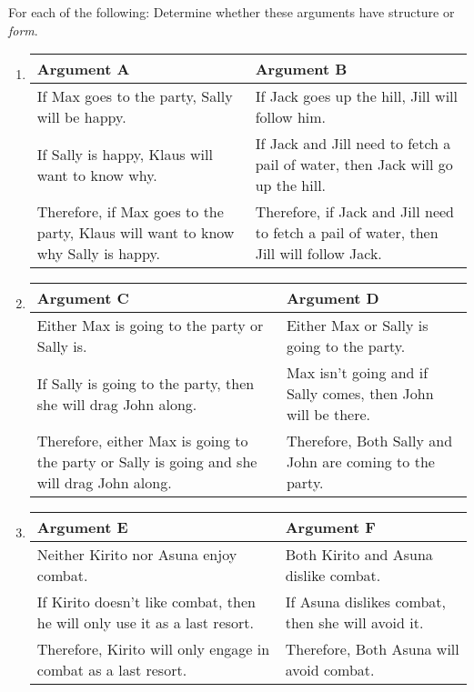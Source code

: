 \practiceproblems
\problempart
\label{pr.shapeofargs}
For each of the following: Determine whether these arguments have structure or \emph{form}.
\begin{enumerate}
\item

\begin{tabular}{p{4.8cm}|p{4.8cm}}
	Argument A&Argument B\\\hline
	If Max goes to the party, Sally will be happy. & If Jack goes up the hill, Jill will follow him.\\
	If Sally is happy, Klaus will want to know why. & If Jack and Jill need to fetch  a pail of water, then Jack will go up the hill.\\
	Therefore, if Max goes to the party, Klaus will want to know why Sally is happy. & Therefore, if Jack and Jill need to fetch a pail of water, then Jill will follow Jack.\\
	\end{tabular} 

\item

\begin{tabular}{p{4.8cm}|p{4.8cm}}
	Argument C&Argument D\\\hline
	Either Max is going to the party or Sally is. & Either Max or Sally is going to the party.\\
	If Sally is going to the party, then she will drag John along. & Max isn't going and if Sally comes, then John will be there.\\
	Therefore, either Max is going to the party or Sally is going and she will drag John along. & Therefore, Both Sally and John are coming to the party.\\
	\end{tabular} 

\item

\begin{tabular}{p{4.8cm}|p{4.8cm}}
	Argument E&Argument F\\\hline
	Neither Kirito nor Asuna enjoy combat. & Both Kirito and Asuna dislike combat.\\
	If Kirito doesn't like combat, then he will only use it as a last resort. & If Asuna dislikes combat, then she will avoid it.\\
	Therefore, Kirito will only engage in combat as a last resort. & Therefore, Both Asuna will avoid combat.\\
	\end{tabular} 


\end{enumerate}
